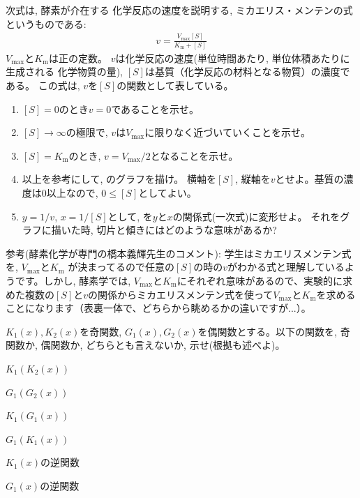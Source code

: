 \begin{exq}\label{q:Michaelis_Menten} 次式は, 酵素が介在する
化学反応の速度を説明する, ミカエリス・メンテンの式というものである: 
\begin{eqnarray}
v=\frac{V_{\text{max}}[S]}{K_{\text{m}}+[S]}\label{eq:Michaelis_Menten0}
\end{eqnarray}
$V_{\text{max}}$と$K_{\text{m}}$は正の定数。
$v$は化学反応の速度(単位時間あたり, 単位体積あたりに生成される
化学物質の量), $[S]$は基質（化学反応の材料となる物質）の濃度である。
この式は, $v$を$[S]$の関数として表している。
\begin{enumerate}
\item $[S]=0$のとき$v=0$であることを示せ。
\item $[S]\rightarrow\infty$の極限で, $v$は$V_{\text{max}}$に限りなく近づいていくことを示せ。
\item $[S]=K_{\text{m}}$のとき, $v=V_{\text{max}}/2$となることを示せ。
\item 以上を参考にして, のグラフを描け。
横軸を$[S]$, 縦軸を$v$とせよ。基質の濃度は0以上なので, $0\leq[S]$としてよい。
\item $y=1/v$, $x=1/[S]$として, を$y$と$x$の関係式(一次式)に変形せよ。
それをグラフに描いた時, 切片と傾きにはどのような意味があるか?
\end{enumerate}\end{exq}\mv

{\small 参考(酵素化学が専門の橋本義輝先生のコメント): 学生はミカエリスメンテン式を, $V_{\text{max}}$と$K_{\text{m}}$
が決まってるので任意の$[S]$の時の$v$がわかる式と理解しているようです。しかし, 酵素学では, $V_{\text{max}}$と$K_{\text{m}}$にそれぞれ意味があるので、実験的に求めた複数の$[S]$と$v$の関係からミカエリスメンテン式を使って$V_{\text{max}}$と$K_{\text{m}}$を求めることになります（表裏一体で、どちらから眺めるかの違いですが...）。}


\begin{exq}\label{q:func_evenodd_gousei} $K_1(x), K_2(x)$を奇関数, 
$G_1(x), G_2(x)$を偶関数とする。以下の関数を, 奇関数か, 偶関数か, 
どちらとも言えないか, 示せ(根拠も述べよ)。
\begin{edaenumerate}
\item $K_1(K_2(x))$
\item $G_1(G_2(x))$
\item $K_1(G_1(x))$
\item $G_1(K_1(x))$
\item $K_1(x)$の逆関数
\item $G_1(x)$の逆関数
\end{edaenumerate} 
\end{exq}\mv

